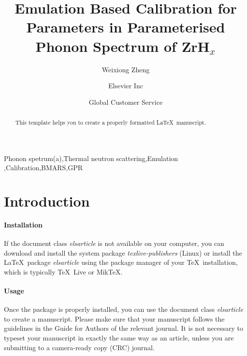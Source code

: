 \documentclass[review]{elsarticle}
\newcommand{\zh}{ZrH$_x$}
\begin{document}
\begin{frontmatter}

\title{Emulation Based Calibration for Parameters in Parameterised Phonon Spectrum of \zh}

\author{Weixiong Zheng}
\address{Nuclear Engineering, Texas A\&M University, College Station, TX 77843-3133}

\author[mymainaddress,mysecondaryaddress]{Elsevier Inc}

\author[mysecondaryaddress]{Global Customer Service}

\address[mymainaddress]{1600 John F Kennedy Boulevard, Philadelphia}
\address[mysecondaryaddress]{360 Park Avenue South, New York}

\begin{abstract}
This template helps you to create a properly formatted \LaTeX\ manuscript.
\end{abstract}

\begin{keyword}
Phonon spetrum(a)\sep Thermal neutron scattering\sep Emulation \sep Calibration\sep  BMARS\sep GPR
\end{keyword}

\end{frontmatter}

\linenumbers

\section{Introduction}

\paragraph{Installation} If the document class \emph{elsarticle} is not available on your computer, you can download and install the system package \emph{texlive-publishers} (Linux) or install the \LaTeX\ package \emph{elsarticle} using the package manager of your \TeX\ installation, which is typically \TeX\ Live or Mik\TeX.

\paragraph{Usage} Once the package is properly installed, you can use the document class \emph{elsarticle} to create a manuscript. Please make sure that your manuscript follows the guidelines in the Guide for Authors of the relevant journal. It is not necessary to typeset your manuscript in exactly the same way as an article, unless you are submitting to a camera-ready copy (CRC) journal.
\end{document}
